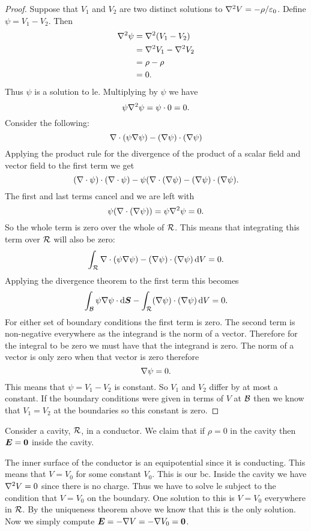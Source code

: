    \begin{proof}
        Suppose that \(V_1\) and \(V_2\) are two distinct solutions to \(\nabla^2 V = -\rho/\varepsilon_0\).
        Define \(\psi = V_1 - V_2\).
        Then
        \begin{align*}
            \nabla^2 \psi &= \nabla^2(V_1 - V_2)\\
            &= \nabla^2 V_1 - \nabla^2 V_2\\
            &= \rho - \rho\\
            &= 0.
        \end{align*}
        Thus \(\psi\) is a solution to \acrshort{le}.
        Multiplying by \(\psi\) we have
        \[\psi\nabla^2\psi = \psi\cdot0 = 0.\]
        Consider the following:
        \[\nabla\cdot(\psi\nabla\psi) - (\nabla\psi)\cdot(\nabla\psi)\]
        Applying the product rule for the divergence of the product of a scalar field and vector field to the first term we get
        \[(\nabla\cdot\psi)\cdot(\nabla\cdot\psi) - \psi(\nabla\cdot(\nabla\psi) - (\nabla\psi)\cdot(\nabla\psi).\]
        The first and last terms cancel and we are left with
        \[\psi(\nabla\cdot(\nabla\psi)) = \psi\nabla^2\psi = 0.\]
        So the whole term is zero over the whole of \(\mathcal{R}\).
        This means that integrating this term over \(\mathcal{R}\) will also be zero:
        \[\int_{\mathcal{R}} \nabla\cdot(\psi\nabla\psi) - (\nabla\psi)\cdot(\nabla\psi)\dd{V} = 0.\]
        Applying the divergence theorem to the first term this becomes
        \[\int_{\mathcal{B}} \psi\nabla\psi\cdot\dd{\bm{S}} - \int_{\mathcal{R}} (\nabla\psi)\cdot(\nabla\psi) \dd{V} = 0.\]
        For either set of boundary conditions the first term is zero.
        The second term is non-negative everywhere as the integrand is the norm of a vector.
        Therefore for the integral to be zero we must have that the integrand is zero.
        The norm of a vector is only zero when that vector is zero therefore
        \[\nabla\psi = 0.\]
        This means that \(\psi = V_1 - V_2\) is constant.
        So \(V_1\) and \(V_2\) differ by at most a constant.
        If the boundary conditions were given in terms of \(V\) at \(\mathcal{B}\) then we know that \(V_1 = V_2\) at the boundaries so this constant is zero.
    \end{proof}
    
    \begin{example}
        Consider a cavity, \(\mathcal{R}\), in a conductor.
        We claim that if \(\rho = 0\) in the cavity then \(\bm{E} = \bm{0}\) inside the cavity.
        
        The inner surface of the conductor is an equipotential since it is conducting.
        This means that \(V = V_0\) for some constant \(V_0\).
        This is our \acrshort{bc}.
        Inside the cavity we have \(\nabla^2 V = 0\) since there is no charge.
        Thus we have to solve \acrshort{le} subject to the condition that \(V = V_0\) on the boundary.
        One solution to this is \(V = V_0\) everywhere in \(\mathcal{R}\).
        By the uniqueness theorem above we know that this is the only solution.
        Now we simply compute \(\bm{E} = -\nabla V = -\nabla V_0 = \bm{0}\).
    \end{example}
    
